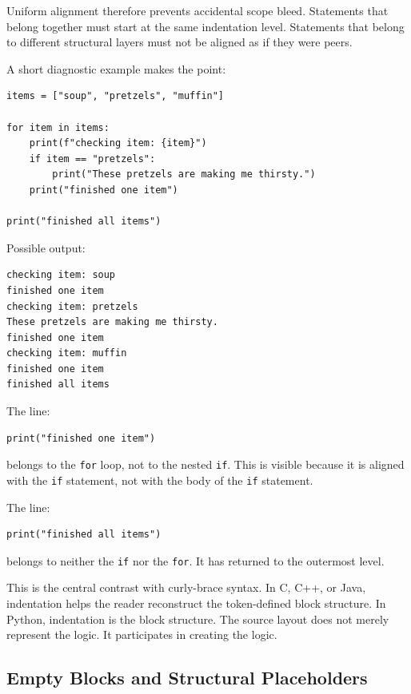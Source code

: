 \documentclass[a4paper,twoside]{report}
\begin{document}
Uniform alignment therefore prevents accidental scope bleed. Statements that belong together must start at the same indentation level. Statements that belong to different structural layers must not be aligned as if they were peers.

A short diagnostic example makes the point:

\begin{verbatim}
items = ["soup", "pretzels", "muffin"]

for item in items:
    print(f"checking item: {item}")
    if item == "pretzels":
        print("These pretzels are making me thirsty.")
    print("finished one item")

print("finished all items")
\end{verbatim}

Possible output:

\begin{verbatim}
checking item: soup
finished one item
checking item: pretzels
These pretzels are making me thirsty.
finished one item
checking item: muffin
finished one item
finished all items
\end{verbatim}

The line:

\begin{verbatim}
print("finished one item")
\end{verbatim}

belongs to the \texttt{for} loop, not to the nested \texttt{if}. This is visible because it is aligned with the \texttt{if} statement, not with the body of the \texttt{if} statement.

The line:

\begin{verbatim}
print("finished all items")
\end{verbatim}

belongs to neither the \texttt{if} nor the \texttt{for}. It has returned to the outermost level.

This is the central contrast with curly-brace syntax. In C, C++, or Java, indentation helps the reader reconstruct the token-defined block structure. In Python, indentation is the block structure. The source layout does not merely represent the logic. It participates in creating the logic.

\subsection{Empty Blocks and Structural Placeholders}
\end{document}
